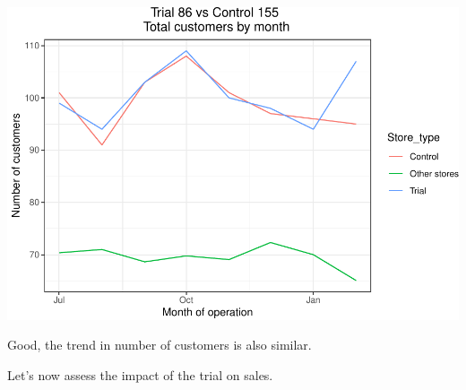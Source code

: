 \documentclass[]{article}
\begin{document}
\includegraphics{Task2_files/figure-latex/unnamed-chunk-10-1.pdf}

Good, the trend in number of customers is also similar.

Let's now assess the impact of the trial on sales.
\end{document}
